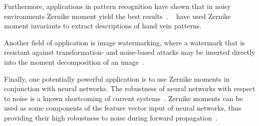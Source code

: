 Furthermore, applications in pattern recognition have shown that in noisy environments Zernike moment yield the best results~\cite{pattern_recognition}. \citeauthor{hand_vein}~\cite{hand_vein} have used Zernike moment invariants to extract descriptions of hand vein patterns.

Another field of application is image watermarking, where a watermark that is resistant against transformation- and noise-based attacks may be inserted directly into the moment decomposition of an image~\cite{watermarking_auth, robust_watermarking, invariant_watermark}.

Finally, one potentially powerful application is to use Zernike moments in conjunction with neural networks. The robustness of neural networks with respect to noise is a known shortcoming of current systems~\cite{nn_robust,nn_noise_robust}. Zernike moments can be used as some components of the feature vector input of neural networks, thus providing their high robustness to noise during forward propagation~\cite{zernike_nn,zernike_nn2}. 
